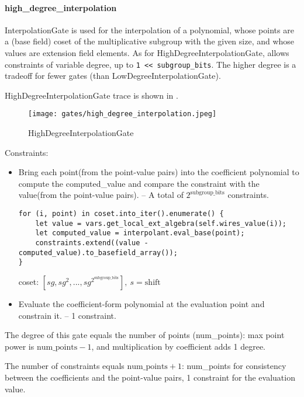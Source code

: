 \paragraph{high\_degree\_interpolation}

InterpolationGate is used for the interpolation of a polynomial, whose points are a (base field) coset of the multiplicative subgroup 
with the given size, and whose values are extension field elements. As for HighDegreeInterpolationGate,  allows constraints of variable degree, 
up to \verb|1 << subgroup_bits|. The higher degree is a tradeoff for fewer gates (than LowDegreeInterpolationGate).


HighDegreeInterpolationGate trace is shown in .

\begin{figure}[!ht]
    \centering
    \texttt{[image: gates/high\_degree\_interpolation.jpeg]}
    \caption{HighDegreeInterpolationGate}
    \label{fig:high-degree-interpolation}
\end{figure}


Constraints:
\begin{itemize}
    \item Bring each point(from the point-value pairs) into the coefficient polynomial to compute the computed\_value 
    and compare the constraint with the value(from the point-value pairs). -- A total of $2^{\text{subgroup\_bits}}$ constraints.
    \begin{lstlisting}
for (i, point) in coset.into_iter().enumerate() {
    let value = vars.get_local_ext_algebra(self.wires_value(i));
    let computed_value = interpolant.eval_base(point);
    constraints.extend((value - computed_value).to_basefield_array());
}
    \end{lstlisting}
    coset: $[sg, sg^2,...,sg^{2^{\text{subgroup\_bits}}}], \ s=\text{shift}$
    \item Evaluate the coefficient-form polynomial at the evaluation point and constrain it. -- 1 constraint.
\end{itemize}

The degree of this gate equals the number of points (num\_points): max point power is $\text{num\_points} - 1$, and multiplication by coefficient adds 1 degree.

The number of constraints equals $\text{num\_points} + 1$: num\_points for consistency between the coefficients and the point-value pairs, 1 constraint for the evaluation value. 
